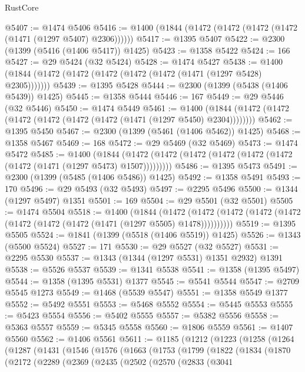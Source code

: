 \begin{lexlean}{RustCore}
\begin{coremodule}
@5407 := @1474 @5406
@5416 := @1400 (@1844 (@1472 (@1472 (@1472 (@1472 (@1471 (@1297 @5407) @2306))))))
@5417 := @1395 @5407
@5422 := @2300 (@1399 (@5416 (@1406 @5417)) @1425)
@5423 := @1358 @5422
@5424 := 166
@5427 := @29 @5424 (@32 @5424)
@5428 := @1474 @5427
@5438 := @1400 (@1844 (@1472 (@1472 (@1472 (@1472 (@1472 (@1471 (@1297 @5428) @2305)))))))
@5439 := @1395 @5428
@5444 := @2300 (@1399 (@5438 (@1406 @5439)) @1425)
@5445 := @1358 @5444
@5446 := 167
@5449 := @29 @5446 (@32 @5446)
@5450 := @1474 @5449
@5461 := @1400 (@1844 (@1472 (@1472 (@1472 (@1472 (@1472 (@1472 (@1471 (@1297 @5450) @2304))))))))
@5462 := @1395 @5450
@5467 := @2300 (@1399 (@5461 (@1406 @5462)) @1425)
@5468 := @1358 @5467
@5469 := 168
@5472 := @29 @5469 (@32 @5469)
@5473 := @1474 @5472
@5485 := @1400
    (@1844 (@1472 (@1472 (@1472 (@1472 (@1472 (@1472 (@1472 (@1471 (@1297 @5473) @1507)))))))))
@5486 := @1395 @5473
@5491 := @2300 (@1399 (@5485 (@1406 @5486)) @1425)
@5492 := @1358 @5491
@5493 := 170
@5496 := @29 @5493 (@32 @5493)
@5497 := @2295 @5496
@5500 := @1344 (@1297 @5497) @1351
@5501 := 169
@5504 := @29 @5501 (@32 @5501)
@5505 := @1474 @5504
@5518 := @1400
    (@1844
      (@1472 (@1472 (@1472 (@1472 (@1472 (@1472 (@1472 (@1472 (@1471 (@1297 @5505) @1478))))))))))
@5519 := @1395 @5505
@5524 := @1841 (@1399 (@5518 (@1406 @5519)) @1425)
@5526 := @1343 (@5500 @5524)
@5527 := 171
@5530 := @29 @5527 (@32 @5527)
@5531 := @2295 @5530
@5537 := @1343 (@1344 (@1297 @5531) @1351 @2932) @1391
@5538 := @5526 @5537
@5539 := @1341 @5538
@5541 := @1358 (@1395 @5497)
@5544 := @1358 (@1395 @5531) @1377
@5545 := @5541 @5544
@5547 := @2709 @5545 @1273
@5549 := @1468 (@5539 @5547)
@5551 := @1358 @5549 @1377
@5552 := @5492 @5551
@5553 := @5468 @5552
@5554 := @5445 @5553
@5555 := @5423 @5554
@5556 := @5402 @5555
@5557 := @5382 @5556
@5558 := @5363 @5557
@5559 := @5345 @5558
@5560 := @1806 @5559
@5561 := @1407 @5560
@5562 := @1406 @5561
@5611 := @1185
    (@1212
      (@1223
        (@1258
          (@1264
            (@1287
              (@1431
                (@1546
                  (@1576
                    (@1663
                      (@1753
                        (@1799
                          (@1822
                            (@1834
                              (@1870
                                (@2172
                                  (@2289
                                    (@2369
                                      (@2435
                                        (@2502
                                          (@2570
                                            (@2833
                                              (@3041

\end{coremodule}
\end{lexlean}
